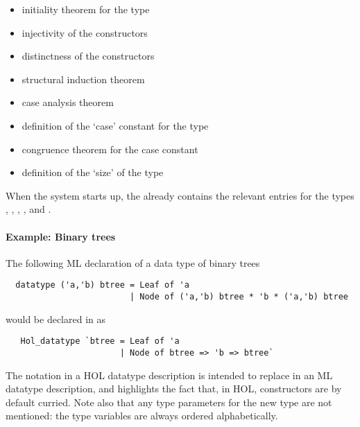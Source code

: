 \begin{itemize}
\item initiality theorem for the type
\item injectivity of the constructors
\item distinctness of the constructors
\item structural induction theorem
\item case analysis theorem
\item definition of the `case' constant for the type
\item congruence theorem for the case constant
\item definition of the `size' of the type
\end{itemize}

When the \HOL{} system
starts up, the  already contains the relevant entries for
the types , , , ,
and .  

\paragraph{Example: Binary trees}
The following ML declaration of a data type of binary trees
\begin{hol}
\begin{verbatim}
  datatype ('a,'b) btree = Leaf of 'a
                         | Node of ('a,'b) btree * 'b * ('a,'b) btree
\end{verbatim}
\end{hol}
\noindent would be declared in \HOL{} as
\begin{hol}
\begin{verbatim}
   Hol_datatype `btree = Leaf of 'a
                       | Node of btree => 'b => btree`
\end{verbatim}
\end{hol}
\noindent The \holtxt{=>} notation in a HOL datatype description 
is intended to replace \holtxt{*} in an ML datatype description, 
and highlights the fact that, in HOL, constructors are by default 
curried.  Note also that any type parameters for the new type are not 
mentioned: the type variables are always ordered alphabetically.

